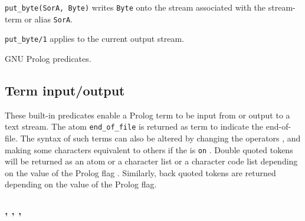 \Description

\texttt{put\_byte(SorA, Byte)} writes \texttt{Byte} onto the stream
associated with the stream-term or alias \texttt{SorA}.

\texttt{put\_byte/1} applies to the current output stream.

\begin{PlErrors}








\end{PlErrors}

\Portability

GNU Prolog predicates.

\subsection{Term input/output}
\label{Term-input/output}
These built-in predicates enable a Prolog term to be input from or output to
a text stream. The atom \texttt{end\_of\_file} is returned as term to
indicate the end-of-file. The syntax of such terms can also be altered by
changing the operators , and making some
characters equivalent to others  if the
  is \texttt{on}
. Double quoted tokens will be returned as an atom
or a character list or a character code list depending on the value of the
 Prolog flag . Similarly, back quoted tokens are returned depending on the value of the
 Prolog flag.

\subsubsection{,\label{read-term/3}
               ,
               ,
               }


